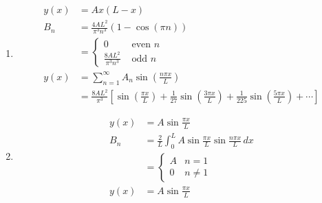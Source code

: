 \documentclass{article}
\begin{document}
\begin{enumerate}
  \item

        \begin{align*}
          y(x) & = A x (L - x)                                                                                                                                                                                  \\
          B_n  & = \frac{4 A L^2}{\pi^3 n^3} (1 - \cos (\pi n))                                                                                                                                                 \\
               & = \begin{cases}
                     0                         & \text{ even } n \\
                     \frac{8 A L^2}{\pi^3 n^3} & \text{ odd } n
                   \end{cases}                                                                                                                                                  \\
          y(x) & = \sum_{n=1}^\infty A_n \sin \left( \frac{n \pi x}{L} \right)                                                                                                                                  \\
               & = \frac{8 A L^2}{\pi^3} \left[ \sin \left( \frac{\pi x}{L} \right) + \frac{1}{27} \sin \left( \frac{3 \pi x}{L} \right) + \frac{1}{225} \sin \left( \frac{5 \pi x}{L} \right) + \cdots \right]
        \end{align*}

  \item

        \begin{align*}
          y(x) & = A \sin \frac{\pi x}{L}                                                  \\
          B_n  & = \frac{2}{L} \int_0^L A \sin \frac{\pi x}{L} \sin \frac{n \pi x}{L} \,dx \\
               & = \begin{cases}
                     A & n = 1   \\
                     0 & n \ne 1
                   \end{cases}                                                            \\
          y(x) & = A \sin \frac{\pi x}{L}
        \end{align*}


\end{enumerate}
\end{document}
